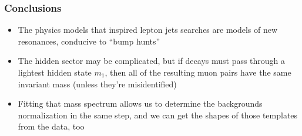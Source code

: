 \documentclass[compress]{beamer}
\begin{document}
\begin{frame}
\frametitle{Conclusions}
\begin{itemize}\setlength{\itemsep}{0.5 cm}
\item The physics models that inspired lepton jets searches are models
  of new resonances, conducive to ``bump hunts''

\item The hidden sector may be complicated, but if decays must pass
  through a lightest hidden state $m_1$, then all of the resulting
  muon pairs have the same invariant mass (unless they're
  misidentified)

\item Fitting that mass spectrum allows us to determine the
  backgrounds normalization in the same step, and we can get the
  shapes of those templates from the data, too
\end{itemize}
\label{numpages}
\end{frame}
\end{document}
